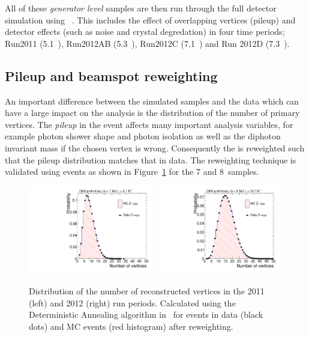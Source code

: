 All of these \emph{generator level} samples are then run through the full \CMS detector simulation using \GEANT~\cite{geant}. This includes the effect of overlapping vertices (pileup) and detector effects (such as noise and crystal degredation) in four time periods; Run2011 (5.1~\fb), Run2012AB (5.3~\fb), Run2012C (7.1~\fb) and Run 2012D (7.3~\fb).


\subsection{Pileup and beamspot reweighting}
\label{sec:pileup_beamspot}

An important difference between the simulated samples and the data which can have a large impact on the analysis is the distribution of the number of primary vertices. The \emph{pileup} in the event affects many important analysis variables, for example photon shower shape and photon isolation as well as the diphoton invariant mass if the chosen vertex is wrong. Consequently the \MC is reweighted such that the pileup distribution matches that in data. The reweighting technique is validated using \Zmumu events as shown in Figure~\ref{fig:pileup} for the 7 and 8~\TeV samples. 

\begin{figure}
  \begin{center}
  \includegraphics[width=0.49\textwidth]{analysis_comps/plots/nvtx_zmumu_2011.pdf}
  \includegraphics[width=0.49\textwidth]{analysis_comps/plots/nvtx_zmumu_2012.pdf}
  \caption[Distribution of the number of reconstructed vertices]{Distribution of the number of reconstructed vertices in the 2011 (left) and 2012 (right) run periods. Calculated using the Deterministic Annealing algorithm in~\cite{deterministic_annealing} for \Zmumu events in data (black dots) and MC events (red histogram) after reweighting.}
  \label{fig:pileup}
  \end{center}
\end{figure}

